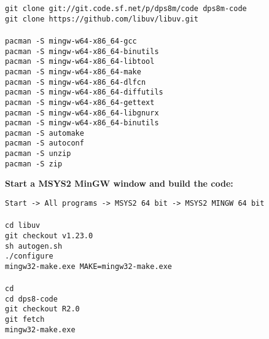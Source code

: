 \begin{adjustwidth}{5ex}{1ex}
	\texttt{git clone git://git.code.sf.net/p/dps8m/code dps8m-code} \\
    \texttt{git clone https://github.com/libuv/libuv.git} \\
    \\
    \texttt{pacman -S mingw-w64-x86\_64-gcc} \\
    \texttt{pacman -S mingw-w64-x86\_64-binutils} \\
    \texttt{pacman -S mingw-w64-x86\_64-libtool} \\
    \texttt{pacman -S mingw-w64-x86\_64-make} \\
    \texttt{pacman -S mingw-w64-x86\_64-dlfcn} \\
    \texttt{pacman -S mingw-w64-x86\_64-diffutils} \\
    \texttt{pacman -S mingw-w64-x86\_64-gettext} \\
    \texttt{pacman -S mingw-w64-x86\_64-libgnurx} \\
    \texttt{pacman -S mingw-w64-x86\_64-binutils} \\
    \texttt{pacman -S automake} \\
    \texttt{pacman -S autoconf} \\
    \texttt{pacman -S unzip} \\
    \texttt{pacman -S zip} \\
\end{adjustwidth}  

\textbf{Start a MSYS2 MinGW window and build the code:}

\begin{adjustwidth}{5ex}{1ex}
    \texttt{Start -> All programs -> MSYS2 64 bit -> MSYS2 MINGW 64 bit} \\
\\
    \texttt{cd libuv} \\
    \texttt{git checkout v1.23.0} \\
    \texttt{sh autogen.sh} \\
    \texttt{./configure} \\
    \texttt{mingw32-make.exe MAKE=mingw32-make.exe} \\
\\
    \texttt{cd} \\
    \texttt{cd dps8-code} \\
    \texttt{git checkout R2.0} \\
    \texttt{git fetch} \\
    \texttt{mingw32-make.exe} \\
\end{adjustwidth}  

